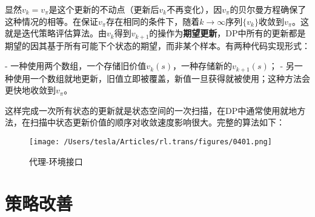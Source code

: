 \documentclass{ctexart}
\begin{document}
显然$v_k=v_\pi$是这个更新的不动点（更新后$v_k$不再变化），因$v_\pi$的贝尔曼方程确保了这种情况的相等。在保证$v_\pi$存在相同的条件下，随着$k\to\infty$序列$\{v_k\}$收敛到$v_\pi$。这就是迭代策略评估算法。由$v_k$得到$v_{k+1}$的操作为\textbf{期望更新}，DP中所有的更新都是期望的因其基于所有可能下个状态的期望，而非某个样本。有两种代码实现形式：

- 一种使用两个数组，一个存储旧价值$v_k(s)$，一种存储新的$v_{k+1}(s)$；
- 另一种使用一个数组就地更新，旧值立即被覆盖，新值一旦获得就被使用；这种方法会更快地收敛到$v_\pi$。

这样完成一次所有状态的更新就是状态空间的一次扫描，在DP中通常使用就地方法，在扫描中状态更新价值的顺序对收敛速度影响很大。完整的算法如下：

\begin{figure}[htbp]
    \centering
    \texttt{[image: /Users/tesla/Articles/rl.trans/figures/0401.png]}
    \caption{代理-环境接口}
    \label{fig:0401} 
\end{figure}



\section{策略改善}
\end{document}
